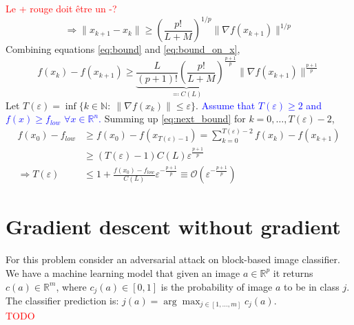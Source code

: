 \documentclass[12pt, openany]{report}
\newcommand{\R}{\mathbb{R}}
\renewcommand{\O}{\mathcal{O}}
\theoremstyle{definition}
\begin{document}
\textcolor{red}{Le + rouge doit être un -?}
\begin{equation}\label{eq:bound_on_x}
	\Longrightarrow \lVert x_{k+1}-x_k\rVert \ge \left(\frac{p!}{L+M}\right)^{1/p}\lVert \nabla f(x_{k+1})\rVert^{1/p}
\end{equation}
Combining equations \eqref{eq:bound} and \eqref{eq:bound_on_x}, 
\begin{equation}\label{eq:next_bound}
	f(x_k)-f(x_{k+1}) \ge \underbrace{\frac{L}{(p+1)!}\left(\frac{p!}{L+M}\right)^{\frac{p+1}{p}}}_{\eqcolon C(L)} \lVert \nabla f(x_{k+1})\rVert^{\frac{p+1}{p}}
\end{equation}
Let $T(\varepsilon) = \inf \{k\in \mathbb{N}:\: \lVert \nabla f(x_k)\rVert\le \varepsilon\}$. \textcolor{blue}{Assume that $T(\varepsilon)\ge 2$ and $f(x)\ge f_{low}$ $\forall x\in \R^n$.} Summing up \eqref{eq:next_bound} for $k=0,\dots, T(\varepsilon)-2$,
\begin{equation}
	\begin{aligned}
		f(x_0)-f_{low} &\ge f(x_0)-f(x_{T(\varepsilon)-1}) = \sum_{k=0}^{T(\varepsilon)-2} f(x_k)-f(x_{k+1}) \\ 
		& \ge (T(\varepsilon)-1)C(L) \varepsilon^{\frac{p+1}{p}}\\
		\Longrightarrow T(\varepsilon) &\le 1 + \frac{f(x_0)-f_{low}}{C(L)} \varepsilon^{-\frac{p+1}{p}} \equiv \O\left(\varepsilon^{-\frac{p+1}{p}}\right)
	\end{aligned}
\end{equation}
\chapter{Gradient descent without gradient}\label{chap:}
For this problem consider an adversarial attack on block-based image classifier. We have a machine learning model that given an image $a\in\R^p$ it returns $c(a)\in\R^m$, where $c_j(a) \in [0,1]$ is the probability of image $a$ to be in class $j$. The classifier prediction is: $j(a) = \arg\max_{j\in [1,\dots,m]} c_j(a)$.\\
\textcolor{red}{TODO}
\newline
\end{document}
